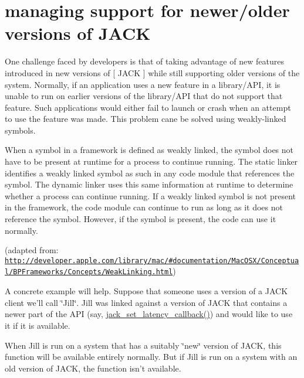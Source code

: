\hypertarget{group__WeakLinkage}{\section{managing support for newer/older versions of \-J\-A\-C\-K}
\label{d9/dcc/group__WeakLinkage}
}
\-One challenge faced by developers is that of taking advantage of new features introduced in new versions of \mbox{[} \-J\-A\-C\-K \mbox{]} while still supporting older versions of the system. \-Normally, if an application uses a new feature in a library/\-A\-P\-I, it is unable to run on earlier versions of the library/\-A\-P\-I that do not support that feature. \-Such applications would either fail to launch or crash when an attempt to use the feature was made. \-This problem cane be solved using weakly-\/linked symbols.

\-When a symbol in a framework is defined as weakly linked, the symbol does not have to be present at runtime for a process to continue running. \-The static linker identifies a weakly linked symbol as such in any code module that references the symbol. \-The dynamic linker uses this same information at runtime to determine whether a process can continue running. \-If a weakly linked symbol is not present in the framework, the code module can continue to run as long as it does not reference the symbol. \-However, if the symbol is present, the code can use it normally.

(adapted from\-: \href{http://developer.apple.com/library/mac/#documentation/MacOSX/Conceptual/BPFrameworks/Concepts/WeakLinking.html}{\tt http\-://developer.\-apple.\-com/library/mac/\#documentation/\-Mac\-O\-S\-X/\-Conceptual/\-B\-P\-Frameworks/\-Concepts/\-Weak\-Linking.\-html})

\-A concrete example will help. \-Suppose that someone uses a version of a \-J\-A\-C\-K client we'll call \char`\"{}\-Jill\char`\"{}. \-Jill was linked against a version of \-J\-A\-C\-K that contains a newer part of the \-A\-P\-I (say, \hyperlink{jack_8h_a70a38fb1e74c5e9df9f1305c695c58bf}{jack\-\_\-set\-\_\-latency\-\_\-callback()}) and would like to use it if it is available.

\-When \-Jill is run on a system that has a suitably \char`\"{}new\char`\"{} version of \-J\-A\-C\-K, this function will be available entirely normally. \-But if \-Jill is run on a system with an old version of \-J\-A\-C\-K, the function isn't available.

